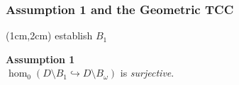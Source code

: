 \begin{frame}
  \frametitle{{\small Assumption 1 and the Geometric TCC}}

  \begin{textblock*}{11cm}(1cm,2cm)
    {\color{red} establish $B_1$}

    \textbf{Assumption 1}\\ $\hom_0(D\setminus B_{1}\hookrightarrow D\setminus B_\omega)$ is \emph{surjective}.
  \end{textblock*}


\end{frame}
